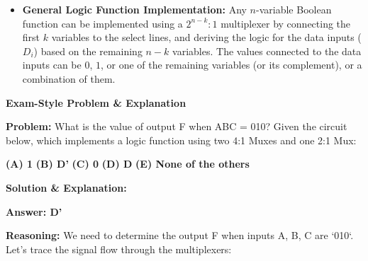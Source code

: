 \documentclass{article}
\begin{document}
\begin{itemize}
\begin{itemize}
            \item \textbf{General Logic Function Implementation:} Any $n$-variable Boolean function can be implemented using a $2^{n-k}:1$ multiplexer by connecting the first $k$ variables to the select lines, and deriving the logic for the data inputs ($D_i$) based on the remaining $n-k$ variables. The values connected to the data inputs can be $0$, $1$, or one of the remaining variables (or its complement), or a combination of them.
        \end{itemize}
\end{itemize}

\textbf{Exam-Style Problem \& Explanation}

\textbf{Problem:} What is the value of output F when ABC = 010? Given the circuit below, which implements a logic function using two 4:1 Muxes and one 2:1 Mux:



\textbf{(A) 1} \textbf{(B) D'} \textbf{(C) 0} \textbf{(D) D} \textbf{(E) None of the others}

\textbf{Solution \& Explanation:}

\textbf{Answer: D'}

\textbf{Reasoning:} We need to determine the output F when inputs A, B, C are `010`. Let's trace the signal flow through the multiplexers:
\end{document}
